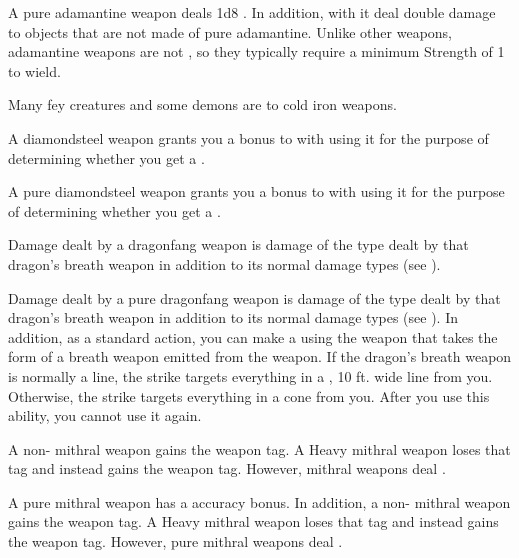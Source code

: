          A pure adamantine weapon deals \plus1d8 .
        In addition,  with it deal double damage to objects that are not made of pure adamantine.
        Unlike other weapons, adamantine weapons are not , so they typically require a minimum Strength of 1 to wield.

         Many fey creatures and some demons are  to cold iron weapons.

         A diamondsteel weapon grants you a  bonus to  with  using it for the purpose of determining whether you get a .

         A pure diamondsteel weapon grants you a  bonus to  with  using it for the purpose of determining whether you get a .

         Damage dealt by a dragonfang weapon is damage of the type dealt by that dragon's breath weapon in addition to its normal damage types (see ).

         Damage dealt by a pure dragonfang weapon is damage of the type dealt by that dragon's breath weapon in addition to its normal damage types (see ).
        In addition, as a standard action, you can make a  using the weapon that takes the form of a breath weapon emitted from the weapon.
        If the dragon's breath weapon is normally a line, the strike targets everything in a \arealarge, 10 ft. wide line from you.
        Otherwise, the strike targets everything in a \areamed cone from you.
        After you use this ability, you  cannot use it again.

         A non- mithral weapon gains the  weapon tag.
        A Heavy mithral weapon loses that tag and instead gains the  weapon tag.
        However, mithral weapons deal  .

         A pure mithral weapon has a  accuracy bonus.
        In addition, a non- mithral weapon gains the  weapon tag.
        A Heavy mithral weapon loses that tag and instead gains the  weapon tag.
        However, pure mithral weapons deal  .

